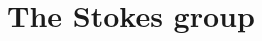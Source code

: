 \begin{comment}
      \textbf{``\Leftarrow{}'':}
      If for some suitable covering $(I_j)$ the cocycle $(\lambda_{jl})$ is a
      coboundary with values in $\Aut_\cA(\tilde\cM^{nf})$, i.e.\
      $\lambda_{jl}=f_lf_j^{-1}$, we define a new connection $\nabla$ on
      $\tilde\cM^{nf}$ by conjugating $\nabla^{nf}$ by $f_j$ on $U_j$.

      \TODO{}

      Moreover $\hat f_j=\hat f_l$ on $U_j\cap U_l$, so that the formal
      isomorphisms
      \[
        \hat f_j:(\hat \cM^{nf},\nabla)
        \overset{\sim}{\longrightarrow}
        (\hat\cM^{nf},\nabla^{nf})
      \]
      can be glued in an isomorphism $\hat f:(\hat \cM^{nf},\nabla)
      \overset{\sim}{\longrightarrow}(\hat\cM^{nf},\nabla^{nf})$.
    \end{proof}

    Thus, the proof of~\ref{thm:mainThm1} is a consequence of the following
    theorem by Malgrange and Sibuya.
    \begin{thm}[Malgrange-Sibuya]\label{thm:malgSibuyaHelp}
      \marginnote{\cite[Thm.II.6.10]{sabbah2007isomonodromic}}
      The image of the mapping
      \[
        H^1(S^1,\Gl_d^{<0}(\cA_{\tilde D}))
        \to
        H^1(H^1,\Gl_d(\cA_{\tilde D}))
      \]
      is the identity.
    \end{thm}
    For the proof of Theorem~\ref{thm:malgSibuyaHelp} which we refer to
    \cite[Th.A.1]{Malgrange1983}, \cite[Th.6.4.1]{sibuya1990Linear} and
    \cite{babbitt1989local}.
  \end{proof}
\end{comment}

\section{The Stokes group}\label{sec:StokesGroup}
